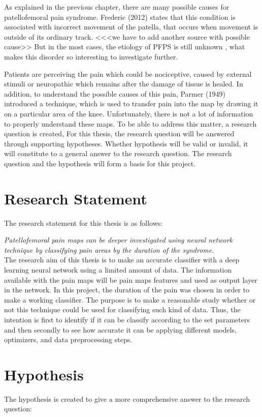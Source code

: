 
As explained in the previous chapter, there are many possible causes for patellofemoral pain syndrome. Frederic (2012) states that this condition is associated with incorrect movement of the patella, that occurs when movement is outside of its ordinary track. <<<we have to add another source with possible cause>> But in the most cases, the etiology of PFPS is still unknown \citep{Smith2015}, what makes this disorder so interesting to investigate further. 

Patients are perceiving the pain which could be nociceptive, caused by external stimuli or neuropathic which remains after the damage of tissue is healed. In addition, to understand the possible causes of this pain, Parmer (1949) introduced a technique, which is used to transfer pain into the map by drawing it on a particular area of the knee. Unfortunately, there is not a lot of information to properly understand these maps. To be able to address this matter, a research question is created,
For this thesis, the research question will be answered through supporting hypotheses. Whether hypothesis will be valid or invalid, it will constitute to a general answer to the research question. The research question and the hypothesis will form a basis for this project.
\section{Research Statement}
The research statement for this thesis is as follows:\\
\noindent

\textit{Patellofemoral pain maps can be deeper investigated using neural network technique by classifying pain areas by the duration of the syndrome.}\\

The research aim of this thesis is to make an accurate classifier with a deep learning neural network using a limited amount of data. The information available with the pain maps will be pain maps features and used as output layer in the network. In this project, the duration of the pain was chosen in order to make a working classifier. The purpose is to make a reasonable study whether or not this technique could be used for classifying such kind of data. Thus, the intention is first to identify if it can be classify according to the set parameters and then secondly to see how accurate it can be applying different models, optimizers, and data preprocessing steps.
\section{Hypothesis}
The hypothesis is created to give a more comprehensive answer to the research question:\\
\noindent

